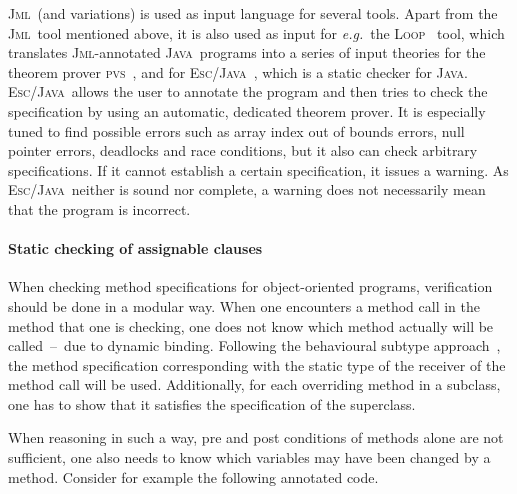 \documentclass[a4paper]{llncs}
\newcommand{\jml}{\textsc{Jml}}
\newcommand{\escj}{\textsc{Esc/Java}}
\newcommand{\java}{\textsc{Java}}
\newcommand{\csrc}{\textsc{Compaq Src}}
\begin{document}

\jml\ (and variations) is used as input language for several
tools. Apart from the \jml\ tool mentioned above, it is also used as
input for \emph{e.g.}~the \textsc{Loop}~\cite{LoopURL} tool, which translates
\jml-annotated \java\ programs into a series of input theories for the 
theorem prover \textsc{pvs}~\cite{?}, and for \escj~\cite{ESCJavaUrl}, 
which is a static checker for \java. \escj\ allows the user to
annotate the program and then tries to check the specification by
using an automatic, dedicated theorem prover. It is especially tuned
to find possible errors such as array index out of bounds errors, null 
pointer errors, deadlocks and race conditions, but it also can check
arbitrary specifications. If it cannot establish a certain
specification, it issues a warning. As \escj\ neither is sound nor
complete, a warning does not necessarily mean that the program is incorrect.



\paragraph{\bf{Static checking of assignable clauses}}
When checking method specifications for object-oriented programs,
verification should be done in a modular way. When one encounters a
method call in the method that one is checking, one does not know
which method actually will be called~--~due to dynamic
binding. Following the behavioural subtype approach~\cite{LiskovW?},
the method specification corresponding with the static type of the
receiver of the method call will be used. Additionally, for each
overriding method in a subclass, one has to show that it satisfies the 
specification of the superclass. 

When reasoning in such a way, pre and post conditions of methods alone 
are not sufficient, one also needs to know which variables may have
been changed by a method. Consider for example the following annotated 
code.

\end{document}
